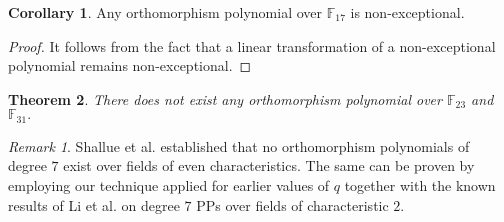 \documentclass[12pt,a4wide, reqno]{amsart}
\newtheorem{theorem}{Theorem}[section]
\theoremstyle{definition}
\newtheorem{corollary}[theorem]{Corollary}
\theoremstyle{remark}
\newtheorem{remark}{Remark}
\numberwithin{equation}{section}
\begin{document}
\begin{corollary}
    Any orthomorphism polynomial over $\mathbb{F}_{17}$ is non-exceptional.
\end{corollary}
\begin{proof}
    It follows from the fact that a linear transformation of a non-exceptional polynomial remains non-exceptional.
\end{proof}
\begin{theorem}
    There does not exist any orthomorphism polynomial over $\mathbb{F}_{23}$ and $\mathbb{F}_{31}.$
\end{theorem}
\begin{remark}\label{r3}
Shallue et al. \cite{shallue}  established that no orthomorphism polynomials of degree $7$ exist over fields of even characteristics. The same can be proven by employing our technique applied for earlier values of $q$ together with the known results of Li et al. \cite[Theorem~4.4]{li} on degree $7$ PPs over fields of characteristic $2.$
\end{remark}
\end{document}
